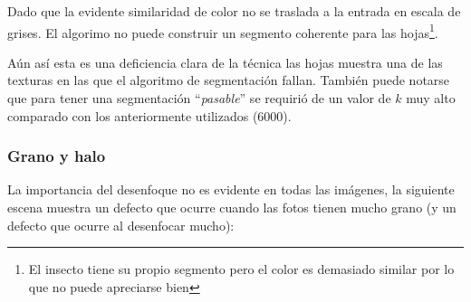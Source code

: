 Dado que la evidente similaridad de color no se traslada a la entrada en escala
de grises. El algorimo no puede construir un segmento coherente para las
hojas\footnote{El insecto tiene su propio segmento pero el color es demasiado
similar por lo que no puede apreciarse bien}.

Aún así esta es una deficiencia clara de la técnica las hojas muestra una de
las texturas en las que el algoritmo de segmentación fallan. También puede
notarse que para tener una segmentación ``\emph{pasable}'' se requirió de un
valor de $k$ muy alto comparado con los anteriormente utilizados (6000).

\subsubsection{Grano y halo}

La importancia del desenfoque no es evidente en todas las imágenes, la
siguiente escena muestra un defecto que ocurre cuando las fotos tienen mucho
grano (y un defecto que ocurre al desenfocar mucho):


